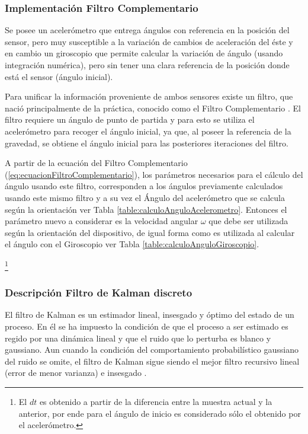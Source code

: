 \documentclass[12pt,a4paper]{article}
\begin{document}
\subsubsection{Implementación Filtro Complementario}
Se posee un acelerómetro que entrega ángulos con referencia en la posición del sensor, pero muy susceptible a la variación de cambios de aceleración del éste y en cambio un giroscopio que permite calcular la variación de ángulo (usando integración numérica), pero sin tener una clara referencia de la posición donde está el sensor (ángulo inicial).

Para unificar la información proveniente de ambos sensores existe un filtro, que nació principalmente de la práctica, conocido como el Filtro Complementario \cite{TesisUSM}.
El filtro requiere un ángulo de punto de partida y para esto se utiliza el acelerómetro para recoger el ángulo inicial, ya que, al poseer la referencia de la gravedad, se obtiene el ángulo inicial para las posteriores iteraciones del filtro.


A partir de la ecuación del Filtro Complementario (\ref{eq:ecuacionFiltroComplementario}), los parámetros necesarios para el cálculo del ángulo usando este filtro, corresponden a los ángulos previamente calculados usando este mismo filtro y a su vez el Ángulo del acelerómetro que se calcula según la orientación ver Tabla \ref{table:calculoAnguloAcelerometro}.
Entonces el parámetro nuevo a considerar es la velocidad angular $\omega$ que debe ser utilizada según la orientación del dispositivo, de igual forma como es utilizada al calcular el ángulo con el Giroscopio ver Tabla \ref{table:calculoAnguloGiroscopio}.


 \footnote{El $dt$ es obtenido a partir de la diferencia entre la muestra actual y la anterior, por ende para el ángulo de inicio es considerado sólo el obtenido por el acelerómetro.}

\subsubsection{Descripción Filtro de Kalman discreto}
El filtro de Kalman es un estimador lineal, insesgado y óptimo del estado de un proceso. En él se ha impuesto la condición de que el proceso a ser estimado es regido por una dinámica lineal y que el ruido que lo perturba es blanco y gaussiano. Aun cuando la condición del comportamiento probabilístico gaussiano del ruido se omite, el filtro de Kalman sigue siendo el mejor filtro recursivo lineal (error de menor varianza) e insesgado \cite{TesisUSM}.
\end{document}
